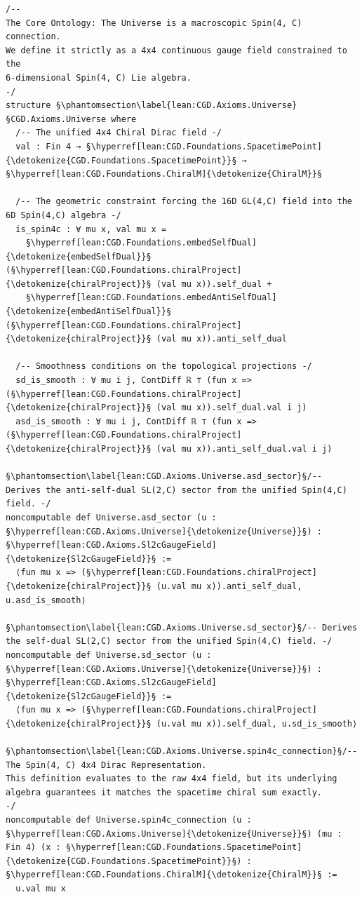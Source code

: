 \begin{verbatim}
/--
The Core Ontology: The Universe is a macroscopic Spin(4, C) connection.
We define it strictly as a 4x4 continuous gauge field constrained to the
6-dimensional Spin(4, C) Lie algebra.
-/
structure §\phantomsection\label{lean:CGD.Axioms.Universe}§CGD.Axioms.Universe where
  /-- The unified 4x4 Chiral Dirac field -/
  val : Fin 4 → §\hyperref[lean:CGD.Foundations.SpacetimePoint]{\detokenize{CGD.Foundations.SpacetimePoint}}§ → §\hyperref[lean:CGD.Foundations.ChiralM]{\detokenize{ChiralM}}§

  /-- The geometric constraint forcing the 16D GL(4,C) field into the 6D Spin(4,C) algebra -/
  is_spin4c : ∀ mu x, val mu x =
    §\hyperref[lean:CGD.Foundations.embedSelfDual]{\detokenize{embedSelfDual}}§ (§\hyperref[lean:CGD.Foundations.chiralProject]{\detokenize{chiralProject}}§ (val mu x)).self_dual +
    §\hyperref[lean:CGD.Foundations.embedAntiSelfDual]{\detokenize{embedAntiSelfDual}}§ (§\hyperref[lean:CGD.Foundations.chiralProject]{\detokenize{chiralProject}}§ (val mu x)).anti_self_dual

  /-- Smoothness conditions on the topological projections -/
  sd_is_smooth : ∀ mu i j, ContDiff ℝ ⊤ (fun x => (§\hyperref[lean:CGD.Foundations.chiralProject]{\detokenize{chiralProject}}§ (val mu x)).self_dual.val i j)
  asd_is_smooth : ∀ mu i j, ContDiff ℝ ⊤ (fun x => (§\hyperref[lean:CGD.Foundations.chiralProject]{\detokenize{chiralProject}}§ (val mu x)).anti_self_dual.val i j)

§\phantomsection\label{lean:CGD.Axioms.Universe.asd_sector}§/-- Derives the anti-self-dual SL(2,C) sector from the unified Spin(4,C) field. -/
noncomputable def Universe.asd_sector (u : §\hyperref[lean:CGD.Axioms.Universe]{\detokenize{Universe}}§) : §\hyperref[lean:CGD.Axioms.Sl2cGaugeField]{\detokenize{Sl2cGaugeField}}§ :=
  ⟨fun mu x => (§\hyperref[lean:CGD.Foundations.chiralProject]{\detokenize{chiralProject}}§ (u.val mu x)).anti_self_dual, u.asd_is_smooth⟩

§\phantomsection\label{lean:CGD.Axioms.Universe.sd_sector}§/-- Derives the self-dual SL(2,C) sector from the unified Spin(4,C) field. -/
noncomputable def Universe.sd_sector (u : §\hyperref[lean:CGD.Axioms.Universe]{\detokenize{Universe}}§) : §\hyperref[lean:CGD.Axioms.Sl2cGaugeField]{\detokenize{Sl2cGaugeField}}§ :=
  ⟨fun mu x => (§\hyperref[lean:CGD.Foundations.chiralProject]{\detokenize{chiralProject}}§ (u.val mu x)).self_dual, u.sd_is_smooth⟩

§\phantomsection\label{lean:CGD.Axioms.Universe.spin4c_connection}§/--
The Spin(4, C) 4x4 Dirac Representation.
This definition evaluates to the raw 4x4 field, but its underlying
algebra guarantees it matches the spacetime chiral sum exactly.
-/
noncomputable def Universe.spin4c_connection (u : §\hyperref[lean:CGD.Axioms.Universe]{\detokenize{Universe}}§) (mu : Fin 4) (x : §\hyperref[lean:CGD.Foundations.SpacetimePoint]{\detokenize{CGD.Foundations.SpacetimePoint}}§) : §\hyperref[lean:CGD.Foundations.ChiralM]{\detokenize{ChiralM}}§ :=
  u.val mu x



\end{verbatim}
